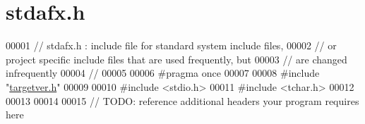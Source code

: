 \hypertarget{stdafx_8h_source}{}\section{stdafx.\+h}
\label{stdafx_8h_source}

\begin{DoxyCode}
00001 \textcolor{comment}{// stdafx.h : include file for standard system include files,}
00002 \textcolor{comment}{// or project specific include files that are used frequently, but}
00003 \textcolor{comment}{// are changed infrequently}
00004 \textcolor{comment}{//}
00005 
00006 \textcolor{preprocessor}{#pragma once}
00007 
00008 \textcolor{preprocessor}{#include "\hyperlink{targetver_8h}{targetver.h}"}
00009 
00010 \textcolor{preprocessor}{#include <stdio.h>}
00011 \textcolor{preprocessor}{#include <tchar.h>}
00012 
00013 
00014 
00015 \textcolor{comment}{// TODO: reference additional headers your program requires here}
\end{DoxyCode}
